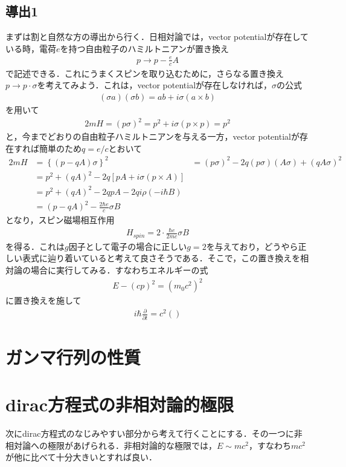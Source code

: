 \documentclass[a4j]{jarticle}
\begin{document}
\subsection{導出1}
まずは割と自然な方の導出から行く．日相対論では，vector potentialが存在している時，電荷$e$を持つ自由粒子のハミルトニアンが置き換え
\begin{align*}
 p\to p-\frac{e}{c}A
\end{align*}
で記述できる．これにうまくスピンを取り込むために，さらなる置き換え$p\to p\cdot\sigma$を考えてみよう．これは，vector potentialが存在しなければ，$\sigma$の公式
\begin{align*}
 (\sigma a)(\sigma b)=ab+i\sigma (a\times b)
\end{align*}
を用いて
\begin{align*}
 2mH=(p\sigma)^2=p^2+i\sigma (p\times p)=p^2
\end{align*}
と，今までどおりの自由粒子ハミルトニアンを与える一方，vector potentialが存在すれば簡単のため$q=e/c$とおいて
\begin{align*}
 2mH&=\left\{(p-qA)\sigma\right\}^2
 &=(p\sigma)^2-2q(p\sigma)(A\sigma)+(qA\sigma)^2\\ 
 &=p^2+(qA)^2-2q\left[pA+i\sigma(p\times A)\right]\\
 &=p^2+(qA)^2-2qpA-2qi\rho(-i\hbar B) \\
 &=(p-qA)^2-\frac{2\hbar e}{c}\sigma B 
\end{align*}
となり，スピン磁場相互作用
\begin{align*}
 H_{spin}=2\cdot\frac{\hbar e}{2mc}\sigma B
\end{align*}
を得る．これは$g$因子として電子の場合に正しい$g=2$を与えており，どうやら正しい表式に辿り着いていると考えて良さそうである．そこで，この置き換えを相対論の場合に実行してみる．すなわちエネルギーの式
\begin{align*}
 E-(cp)^2=(m_0c^2)^2
\end{align*}
に置き換えを施して
\begin{align*}
 i\hbar\frac{\partial}{\partial t}=c^2()
\end{align*}

\section{ガンマ行列の性質}
\section{dirac方程式の非相対論的極限}
次にdirac方程式のなじみやすい部分から考えて行くことにする．その一つに非相対論への極限があげられる．非相対論的な極限では，$E\sim mc^2$，すなわち$mc^2$が他に比べて十分大きいとすれば良い．
\end{document}
